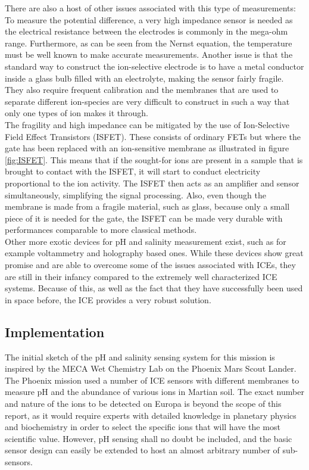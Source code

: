 \noindent
There are also a host of other issues associated with this type of measurements: To measure the potential difference, a very high impedance sensor is needed as the electrical resistance between the electrodes is commonly in the mega-ohm range\cite{website:ph3}. Furthermore, as can be seen from the Nernst equation, the temperature must be well known to make accurate measurements. Another issue is that the standard way to construct the ion-selective electrode is to have a metal conductor inside a glass bulb filled with an electrolyte, making the sensor fairly fragile. They also require frequent calibration and the membranes that are used to separate different ion-species are very difficult to construct in such a way that only one types of ion makes it through\cite{website:ph1}.\\

\noindent
The fragility and high impedance can be mitigated by the use of Ion-Selective Field Effect Transistors (ISFET). These consists of ordinary FETs but where the gate has been replaced with an ion-sensitive membrane as illustrated in figure \ref{fig:ISFET}. This means that if the sought-for ions are present in a sample that is brought to contact with the ISFET, it will start to conduct electricity proportional to the ion activity. The ISFET then acts as an amplifier and sensor simultaneously, simplifying the signal processing\cite{website:ph4}. Also, even though the membrane is made from a fragile material, such as glass, because only a small piece of it is needed for the gate, the ISFET can be made very durable with performances comparable to more classical methods\cite{website:ph4}. \\ 

\noindent
Other more exotic devices for pH and salinity measurement exist, such as for example voltammetry\cite{website:senova} and holography\cite{article:marshall2003a} based ones. While these devices show great promise and are able to overcome some of the issues associated with ICEs, they are still in their infancy compared to the extremely well characterized ICE systems. Because of this, as well as the fact that they have successfully been used in space before\cite{article:jgre2487}, the ICE provides a very robust solution.

\subsection{Implementation}
The initial sketch of the pH and salinity sensing system for this mission is inspired by the MECA Wet Chemistry Lab on the Phoenix Mars Scout Lander. The Phoenix mission used a number of ICE sensors with different membranes to measure pH and the abundance of various ions in Martian soil\cite{article:jgre2487}. The exact number and nature of the ions to be detected on Europa is beyond the scope of this report, as it would require experts with detailed knowledge in planetary physics and biochemistry in order to select the specific ions that will have the most scientific value. However, pH sensing shall no doubt be included, and the basic sensor design can easily be extended to host an almost arbitrary number of sub-sensors.

